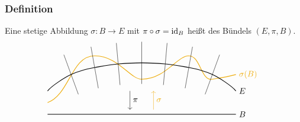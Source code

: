 \subsubsection[Definition: Schnitt von Bündeln]{Definition} %
\label{ssub:437}
Eine stetige Abbildung $\sigma : B  \to E$ mit $\pi \circ \sigma = \operatorname{id}_B$ heißt  des Bündels $(E,\pi ,B)$.
\[
	\begin{tikzpicture}
		\coordinate (a) at (1,1.7);
		\coordinate (b) at (2,2);
		\coordinate (c) at (3,2.15);
		\coordinate (d) at (4,2.2);
		\coordinate (e) at (5,2.15);
		\coordinate (f) at (6,2);
		\coordinate (g) at (7,1.7);

		\draw[thick,DarkGoldenrod2] (0,0.5) .. controls +(20:1) and +(180:1) .. (2,2.5)
		.. controls +(0:1) and +(180:0.5) .. (4,1.5)
		.. controls +(0:1) and +(180:0.5) .. (6,2.5)
		.. controls +(0:0.5) and +(190:0.5) .. (7,1.5)
		.. controls +(10:0.5) and +(195:0.5) .. (8,1.7) node[right]{$\sigma(B)$};
				
		\draw[thick] (0,1) .. controls +(50:0.3) and +(205:0.3) .. (a)
		.. controls +(25:0.4) and +(190:0.4) .. (b)
		.. controls +(10:0.4) and +(185:0.4) .. (c)
		.. controls +(5:0.4) and +(180:0.4) .. (d)
		.. controls +(0:0.4) and +(175:0.4) .. (e)
		.. controls +(-5:0.4) and +(170:0.4) .. (f)
		.. controls +(-10:0.4) and +(155:0.4) .. (g)
		.. controls +(-25:0.3) and +(130:0.3) .. (8,1) node[right]{$E$};
		
		\draw (a) +(110:0.9) -- +(-70:0.9);
		\draw (b) +(100:0.9) -- +(-80:0.9);		
		\draw (c) +(95:0.9) -- +(-85:0.9);
		\draw (d) +(90:0.9) -- +(-90:0.9);
		\draw (e) +(85:0.9) -- +(-95:0.9);
		\draw (f) +(80:0.9) -- +(-100:0.9);
		\draw (g) +(70:0.9) -- +(-110:0.9);				
		
		\draw[->] (3.5,1) -- (3.5,0.6) node[right]{$\pi$} -- (3.5,0.2);
		\draw[->,DarkGoldenrod2] (4.5,0.2) -- (4.5,0.6) node[right]{$\sigma$} -- (4.5,1);
		
		\draw[thick] (0,0) -- (8,0) node[right]{$B$};
	\end{tikzpicture}
\] 

